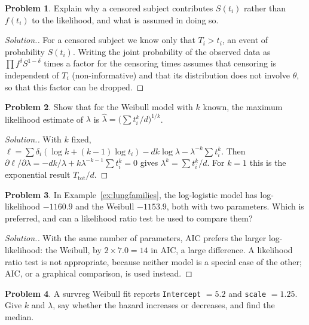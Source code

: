 \documentclass[11pt,a4paper]{article}
\numberwithin{equation}{section}
\theoremstyle{definition}
\newtheorem{problemx}{Problem}[subsection]
\newenvironment{problem}{\begin{problemx}}{\end{problemx}}
\newenvironment{solution}
  {\renewcommand{\qedsymbol}{}\begin{proof}[\textit{Solution}.]}
  {\end{proof}}
\begin{document}
\begin{problem}
Explain why a censored subject contributes $S(t_i)$ rather than $f(t_i)$ to the likelihood, and what is assumed in doing so.
\end{problem}

\begin{solution}
For a censored subject we know only that $T_i > t_i$, an event of probability $S(t_i)$. Writing the joint probability of the observed data as $\prod f^{\delta}S^{1 - \delta}$ times a factor for the censoring times assumes that censoring is independent of $T_i$ (non-informative) and that its distribution does not involve $\theta$, so that this factor can be dropped.
\end{solution}

\begin{problem}
Show that for the Weibull model with $k$ known, the maximum likelihood estimate of $\lambda$ is $\hat\lambda = \bigl(\sum t_i^k/d\bigr)^{1/k}$.
\end{problem}

\begin{solution}
With $k$ fixed, $\ell = \sum\delta_i(\log k + (k - 1)\log t_i) - dk\log\lambda - \lambda^{-k}\sum t_i^k$. Then $\partial\ell/\partial\lambda = -dk/\lambda + k\lambda^{-k - 1}\sum t_i^k = 0$ gives $\lambda^k = \sum t_i^k/d$. For $k = 1$ this is the exponential result $T_{\mathrm{tot}}/d$.
\end{solution}

\begin{problem}
In Example~\ref{ex:lungfamilies}, the log-logistic model has log-likelihood $-1160.9$ and the Weibull $-1153.9$, both with two parameters. Which is preferred, and can a likelihood ratio test be used to compare them?
\end{problem}

\begin{solution}
With the same number of parameters, AIC prefers the larger log-likelihood: the Weibull, by $2 \times 7.0 = 14$ in AIC, a large difference. A likelihood ratio test is not appropriate, because neither model is a special case of the other; AIC, or a graphical comparison, is used instead.
\end{solution}

\begin{problem}
A survreg Weibull fit reports \texttt{Intercept} $= 5.2$ and \texttt{scale} $= 1.25$. Give $k$ and $\lambda$, say whether the hazard increases or decreases, and find the median.
\end{problem}
\end{document}

